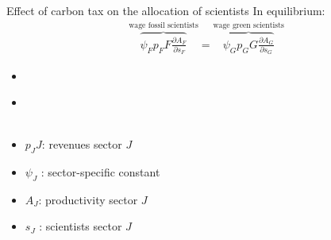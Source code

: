 \documentclass[11pt,aspectratio=169]{beamer}
\begin{document}

\begin{frame}{Effect of carbon tax on the allocation of scientists}
	\vspace{2mm}
	In equilibrium: \large
	\begin{align*}
		\overbrace{{\psi_F} p_F{F}\frac{\partial A_{F}}{\partial s_{F}}}^{\text{wage fossil scientists}}=\overbrace{{\psi_G} p_G{G}\frac{\partial A_{G}}{\partial s_{G}}}^{\text{wage green scientists}}
	\end{align*}
	\normalsize
	\begin{itemize}
		\item[] \ %
		\item[] \ \\ \  %
	\end{itemize}
	\small
	\vspace{4mm}
	\hspace{-2mm}
	\begin{minipage}[t!]{0.4\textwidth}
		\vspace{0mm}
		\begin{itemize}
			\item[] $p_JJ$: revenues sector $J$
			\vspace{-2mm}
			\item[] $\psi_J$ : sector-specific constant
		\end{itemize}
	\end{minipage}
	\vspace{-5mm}
	\begin{minipage}[t!]{0.5\textwidth}
		\vspace{0mm}
		\begin{itemize}	
			\item[] $A_J$: productivity sector $J$
			\vspace{-2mm}			
			\item[] $s_J$ : scientists sector $J$
		\end{itemize}
	\end{minipage}
\end{frame}
\end{document}
